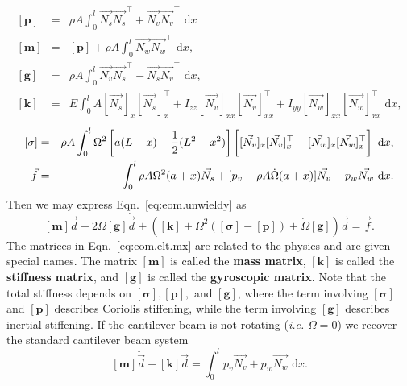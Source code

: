 \begin{eqnarray}
\mathbf{[p]} &=& \rho A\int_0^l\vec{N_s}\vec{N_s}^\top+\vec{N_v}\vec{N_v}^\top\text{ d}x \\
\mathbf{[m]} &=& \mathbf{[p]}+\rho A\int_0^l\vec{N_w}\vec{N_w}^\top\text{ d}x, \\
\mathbf{[g]} &=& \rho A\int_0^l\vec{N_v}\vec{N_s}^\top-\vec{N_s}\vec{N_v}^\top\text{ d}x ,\\
\mathbf{[k]} &=& E\int_0^lA[\vec{N_s}]_x[\vec{N_s}]_x^\top+I_{zz}[\vec{N_v}]_{xx}[\vec{N_v}]_{xx}^\top+I_{yy}[\vec{N_w}]_{xx}[\vec{N_w}]_{xx}^\top\text{ d}x, 
\end{eqnarray}
\begin{eqnarray}
\mathbf{[\sigma]} &=& \rho A\int_0^l \Omega^2\left[a(L-x)+\frac{1}{2}(L^2-x^2)\right]\left[\vphantom{\frac{0}{0}}[\vec{N_v}]_{x}[\vec{N_v}]_{x}^\top+[\vec{N_w}]_{x}[\vec{N_w}]_{x}^\top\right] \text{ d}x, \\
\vec{f} &=& \int_0^l \rho A\Omega^2(a+x)\vec{N_s}+[p_v - \rho A\dot\Omega(a+x)]\vec{N_v}+p_w\vec{N_w}\text{ d}x.
\end{eqnarray}
Then we may express Eqn.~\ref{eq:eom.unwieldy} as
\begin{equation}
\mathbf{[m]}\ddot{\vec d} +2\Omega\mathbf{[g]}\dot{\vec d} + (\mathbf{[k]}+\Omega^2(\mathbf{[\sigma]}-\mathbf{[p]})+\dot\Omega\mathbf{[g]} )\vec d = \vec{f}.
\label{eq:eom.elt.mx}
\end{equation}
The matrices in Eqn.~\ref{eq:eom.elt.mx} are related to the physics and are given special names. The matrix $\mathbf{[m]}$ is called the \textbf{mass matrix}, $\mathbf{[k]}$ is called the \textbf{stiffness matrix}, and $\mathbf{[g]}$ is called the \textbf{gyroscopic matrix}. Note that the total stiffness depends on $\mathbf{[\sigma]},\mathbf{[p]},$ and $\mathbf{[g]}$, where the term involving $\mathbf{[\sigma]}$ and $\mathbf{[p]}$ describes Coriolis stiffening, while the term involving $\mathbf{[g]}$ describes inertial stiffening. If the cantilever beam is not rotating (\emph{i.e.} $\Omega = 0$) we recover the standard cantilever beam system
\begin{equation}
\mathbf{[m]}\ddot{\vec d}+\mathbf{[k]}\vec d = \int_0^l p_v\vec{N_v}+p_w\vec{N_w}\text{ d}x.
\end{equation}


